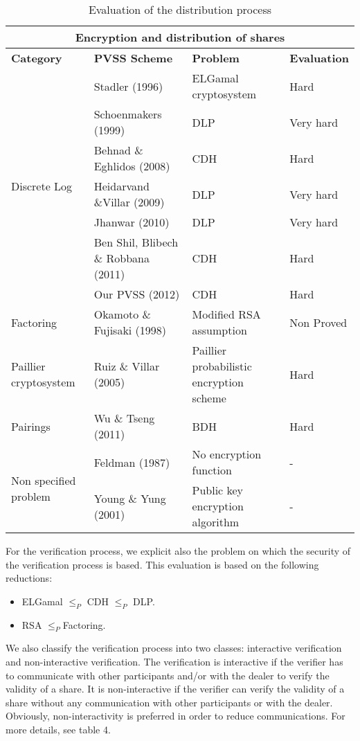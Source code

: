 \documentclass[submission,copyright,creativecommons]{eptcs}
\begin{document}
\begin{table*}[h] \centering \begin{tabular}{|p{3cm}||p{4cm}||p{2.5cm}||p{2.5cm}|}
\hline
\multicolumn{4}{|c|}{\textbf{Encryption and distribution of shares}} \\ 
\hline
\textbf{Category} & \textbf{PVSS Scheme} & \textbf{Problem} & \textbf{Evaluation} \\ \hline
\multirow{7}{*}{Discrete Log} & Stadler (1996) & ELGamal cryptosystem & Hard \\ 
\cline{2-4}
& Schoenmakers (1999) & DLP & Very hard \\ \cline{2-4}
& Behnad \& Eghlidos (2008) & CDH & Hard \\ \cline{2-4}
& Heidarvand \&Villar (2009) & DLP & Very hard \\ \cline{2-4}
& Jhanwar (2010) & DLP & Very hard \\ \cline{2-4}
& Ben Shil, Blibech \& Robbana (2011) & CDH & Hard \\ \cline{2-4}
& Our PVSS (2012) & CDH & Hard \\ \hline
\multirow{1}{*}{Factoring} & Okamoto \& Fujisaki (1998) & Modified RSA assumption
& Non Proved \\ \hline
Paillier cryptosystem & Ruiz \& Villar (2005) & Paillier
probabilistic encryption scheme & Hard \\ \hline
\multirow{1}{*}{Pairings} & Wu \& Tseng (2011) & BDH & Hard \\ \hline
\multirow{2}{3cm}{Non specified problem} & Feldman (1987) & No encryption function & 
- \\ \cline{2-4}
& Young \& Yung (2001) & Public key encryption algorithm & - \\ \hline
\end{tabular}\caption{Evaluation of the distribution process}\label{Evaluation of the
distribution process}\end{table*}For the verification process, we explicit also the problem on which the
security of the verification process is based. This evaluation is based on
the following reductions:

\begin{itemize}
\item ELGamal $\leq _{P}$ CDH $\leq _{P}$ DLP.
\item RSA $\leq _{P}$Factoring.
\end{itemize}

We also classify the verification process into two classes: interactive
verification and non-interactive verification. The verification is
interactive if the verifier has to communicate with other participants
and/or with the dealer to verify the validity of a share. It is
non-interactive if the verifier can verify the validity of a share without
any communication with other participants or with the dealer. Obviously,
non-interactivity is preferred in order to reduce communications. For more
details, see table 4.
\end{document}
